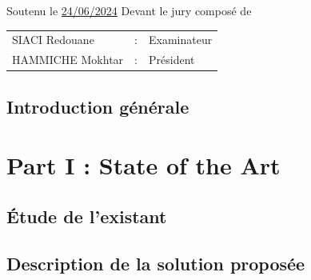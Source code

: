 \documentclass[12pt,a4paper]{report}
\begin{document}
\begin{titlepage}
\begin{center}
    {\normalsize Soutenu le \underline{24/06/2024} Devant le jury composé de} \\
    \vspace{0.4cm}
    \begin{tabular}{lll}
        SIACI Redouane & : & Examinateur \\
        HAMMICHE Mokhtar & : & Président \\
    \end{tabular}
\end{center}
\end{titlepage}





\tableofcontents
\listoffigures

\chapter*{Introduction générale}



\cleardoublepage
\part*{Part I : State of the Art}
\thispagestyle{empty}

\chapter{Étude de l'existant}


\chapter{Description de la solution proposée}



\cleardoublepage
\end{document}
